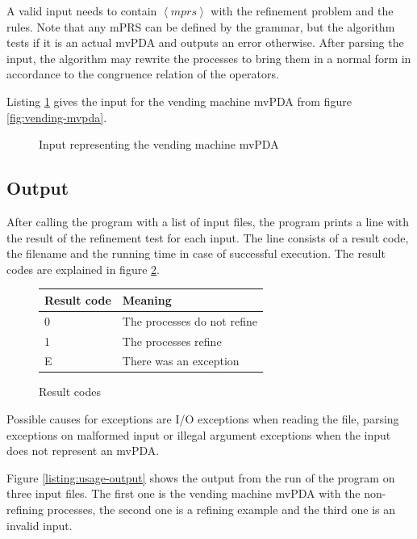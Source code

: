 A valid input needs to contain $\left< mprs \right>$ with the refinement problem and
the rules.
Note that any mPRS can be defined by the grammar, but the algorithm
tests if it is an actual mvPDA and outputs an error otherwise.
After parsing the input, the algorithm may rewrite the processes
to bring them in a normal form in accordance to the congruence relation
of the operators.

\begin{example}
Listing \ref{listing:mprs-input} gives the
input for the vending machine mvPDA from figure \ref{fig:vending-mvpda}.
\end{example}

\begin{figure}[ht]

\caption{Input representing the vending machine mvPDA}
\label{listing:mprs-input}
\end{figure}

\subsection{Output}

After calling the program with a list of input files, the program prints
a line with the result of the refinement test for each input.
The line consists of a result code, the filename and the running time
in case of successful execution. The result codes are explained in
figure \ref{fig:result-codes}.

\begin{figure}[ht]
  \centering
  \begin{tabular}{l|l}
    Result code & Meaning \\
    \hline
    {0} & The processes do not refine \\
    {1} & The processes refine  \\
    {E} & There was an exception
  \end{tabular}
  \caption{Result codes}
  \label{fig:result-codes}
\end{figure}

Possible causes for exceptions are I/O exceptions when reading the file,
parsing exceptions on malformed input or illegal argument exceptions
when the input does not represent an mvPDA.

\begin{example}
Figure \ref{listing:usage-output} shows the output from the run
of the program on three input files. The first one is the vending machine mvPDA
with the non-refining processes,
the second one is a refining example
and the third one is an invalid input.
\end{example}

